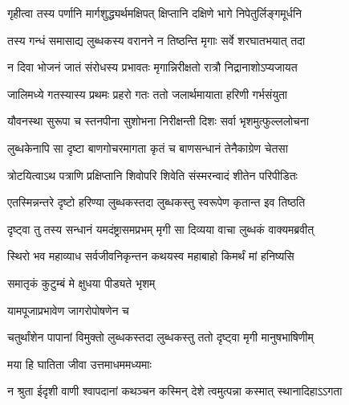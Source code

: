 \twolineshloka
{गृहीत्वा तस्य पर्णानि मार्गशुद्ध्यर्थमक्षिपत्}
{क्षिप्तानि दक्षिणे भागे निपेतुर्लिङ्गमूर्धनि}%

\twolineshloka
{तस्य गन्धं समासाद्य लुब्धकस्य वरानने}
{न तिष्ठन्ति मृगाः सर्वे शरघातभयात् तदा}%

\twolineshloka
{न दिवा भोजनं जातं संरोधस्य प्रभावतः}
{मृगान्निरीक्षतो रात्रौ निद्रानाशोऽप्यजायत}%

\twolineshloka
{जालिमध्ये गतस्यास्य प्रथमः प्रहरो गतः}
{ततो जलार्थमायाता हरिणी गर्भसंयुता}%

\twolineshloka
{यौवनस्था सुरूपा च स्तनपीना सुशोभना}
{निरीक्षन्ती दिशः सर्वा भृशमुत्फुल्ललोचना}%

\twolineshloka
{लुब्धकेनापि सा दृष्टा बाणगोचरमागता}
{कृतं च बाणसन्धानं तेनैकाग्रेण चेतसा}%

\twolineshloka
{त्रोटयित्वाऽथ पत्राणि प्रक्षिप्तानि शिवोपरि}
{शिवेति संस्मरन्वादं शीतेन परिपीडितः}%

\twolineshloka
{एतस्मिन्नन्तरे दृष्टो हरिण्या लुब्धकस्तदा}
{लुब्धकस्तु स्वरूपेण कृतान्त इव तिष्ठति}%

\twolineshloka
{दृष्ट्वा तु तस्य सन्धानं यमदंष्ट्रासमप्रभम्}
{मृगी सा दिव्यया वाचा लुब्धकं वाक्यमब्रवीत्}%


\twolineshloka
{स्थिरो भव महाव्याध सर्वजीवनिकृन्तन}
{कथयस्व महाबाहो किमर्थं मां हनिष्यसि}%



\onelineshloka
{समातृकं कुटुम्बं मे क्षुधया पीड्यते भृशम्}%



\onelineshloka
{याम\footnotemark{}पूजाप्रभावेण जागरोपोषणेन च}%

\twolineshloka
{चतुर्थांशेन पापानां विमुक्तो लुब्धकस्तदा}
{लुब्धकस्तु ततो दृष्ट्वा मृगी मानुषभाषिणीम्}%


\onelineshloka
{मया हि घातिता जीवा उत्तमाधममध्यमाः}%

\twolineshloka
{न श्रुता ईदृशी वाणी श्वापदानां कथञ्चन}
{कस्मिन् देशे त्वमुत्पन्ना कस्मात् स्थानादिहाऽऽगता}%


